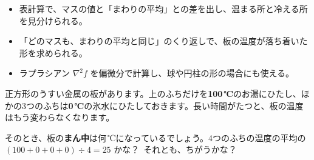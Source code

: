 \newcommand\kviiimtcell[4]{\pgfmathtruncatemacro\kviiim@p{min(100,max(0,#3))*0.6}%
  \filldraw[fill=bkRed!\kviiim@p, draw=bkInk!60, line width=0.4pt] #1 rectangle ++(#2,#2);
  \node[font=\sffamily\footnotesize, text=bkInk] at ($#1+(#2/2,#2/2)$) {#4};}
\newcommand\kviiimplate[6]{\begin{scope}[shift={#1}]
  \fill[bkGray!10] (0,0) rectangle (#2,#2);
  \draw[#3, line width=2.2pt] (0,#2) -- (#2,#2);
  \draw[#4, line width=2.2pt] (#2,#2) -- (#2,0);
  \draw[#5, line width=2.2pt] (#2,0) -- (0,0);
  \draw[#6, line width=2.2pt] (0,0) -- (0,#2);
  \end{scope}}
\makeatother


\begin{goal}
\begin{itemize}[label={\color{\bkTT}●}, leftmargin=1.6\zw, itemsep=0pt, topsep=1pt]
\item {}\enspace 表計算で、マスの値と「まわりの平均」との差を出し、温まる所と冷える所を見分けられる。
\item {}\enspace 「どのマスも、まわりの平均と同じ」のくり返しで、板の温度が落ち着いた形を求められる。
\item {}\enspace ラプラシアン $\nabla^2f$ を偏微分で計算し、球や円柱の形の場合にも使える。
\end{itemize}
\end{goal}

\begin{hatena}
\noindent\begin{minipage}[c]{0.57\linewidth}
\raggedright
正方形のうすい金属の板があります。上のふちだけを\textbf{100\,℃}のお湯にひたし、ほかの3つのふちは\textbf{0\,℃}の氷水にひたしておきます。長い時間がたつと、板の温度はもう変わらなくなります。\par\vspace{4pt}
そのとき、板の\textbf{まん中}は何\,℃になっているでしょう。4つのふちの温度の平均の $(100+0+0+0)\div4=25$ かな？\ それとも、ちがうかな？
\end{minipage}\hfill
\begin{minipage}[c]{0.4\linewidth}
\centering
{}
\end{minipage}
\end{hatena}

